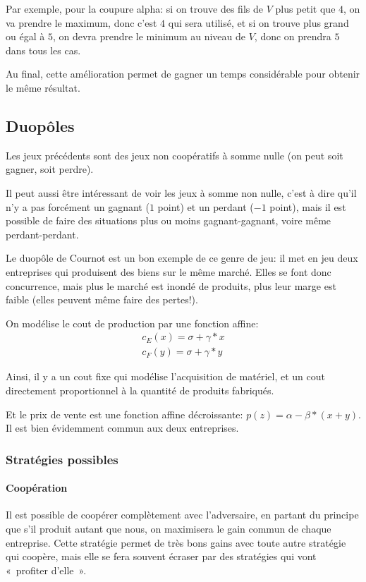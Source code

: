Par exemple, pour la coupure alpha: si on trouve des fils de $V$ plus petit
que $4$, on va prendre le maximum, donc c'est $4$ qui sera utilisé, et si on
trouve plus grand ou égal à $5$, on devra prendre le minimum au niveau de $V$,
donc on prendra $5$ dans tous les cas.

Au final, cette amélioration permet de gagner un temps considérable pour
obtenir le même résultat.

\subsection{Duopôles}
  Les jeux précédents sont des jeux non coopératifs à somme nulle (on peut soit
  gagner, soit perdre).

  Il peut aussi être intéressant de voir les jeux à somme non nulle, c'est à
  dire qu'il n'y a pas forcément un gagnant ($1$ point) et un perdant ($-1$
  point), mais il est possible de faire des situations plus ou moins
  gagnant-gagnant, voire même perdant-perdant.

  Le duopôle de Cournot est un bon exemple de ce genre de jeu: il met en jeu
  deux entreprises qui produisent des biens sur le même marché. Elles se font
  donc concurrence, mais plus le marché est inondé de produits, plus leur marge
  est faible (elles peuvent même faire des pertes!).

  On modélise le cout de production par une fonction affine:
  \[\begin{array}{l}
    c_E(x) = \sigma + \gamma*x \\
    c_F(y) = \sigma + \gamma*y
  \end{array}\]

  Ainsi, il y a un cout fixe qui modélise l'acquisition de matériel, et un cout
  directement proportionnel à la quantité de produits fabriqués.

  Et le prix de vente est une fonction affine décroissante:
    $p(z) = \alpha - \beta*(x + y)$.
  Il est bien évidemment commun aux deux entreprises.

  \subsubsection{Stratégies possibles}

    \paragraph{Coopération} Il est possible de coopérer complètement avec
      l'adversaire, en partant du principe que s'il produit autant que nous,
      on maximisera le gain commun de chaque entreprise.
      Cette stratégie permet de très bons gains avec toute autre stratégie qui
      coopère, mais elle se fera souvent écraser par des stratégies qui vont
      «~profiter d'elle~».

